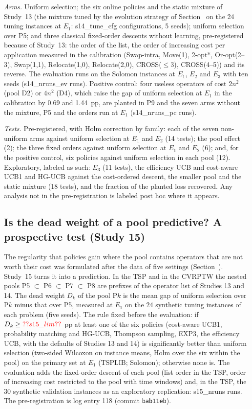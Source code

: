 \emph{Arms.} Uniform selection; the six online policies and the static mixture of Study~13 (the mixture tuned by the evolution strategy of Section~ on the 24 tuning instances at $E_1$: \num{s14_tune_cfg} configurations, 5 seeds); uniform selection over P5; and three classical fixed-order descents without learning, pre-registered because of Study~13: the order of the list, the order of increasing cost per application measured in the calibration (Swap-intra, Move(1), 2-opt*, Or-opt(2--3), Swap(1,1), Relocate(1,0), Relocate(2,0), CROSS($\le3$), CROSS(4--5)) and its reverse. The evaluation runs on the Solomon instances at $E_1$, $E_2$ and $E_3$ with ten seeds (\num{s14_nruns_ev} runs). Positive control: four useless operators of cost $2n^2$ (pool D2) or $4n^2$ (D4), which raise the gap of uniform selection at $E_1$ in the calibration by 0.69 and 1.44~pp, are planted in P9 and the seven arms without the mixture, P5 and the orders run at $E_1$ (\num{s14_nruns_pc} runs).

\emph{Tests.} Pre-registered, with Holm correction by family: each of the seven non-uniform arms against uniform selection at $E_1$ and $E_2$ (14 tests); the pool effect (2); the three fixed orders against uniform selection at $E_1$ and $E_2$ (6); and, for the positive control, six policies against uniform selection in each pool (12). Exploratory, labeled as such: $E_3$ (11 tests), the efficiency UCB and cost-aware UCB1 and HG-UCB against the cost-ordered descent, the smaller pool and the static mixture (18 tests), and the fraction of the planted loss recovered. Any analysis not in the pre-registration is labeled post hoc where it appears.


\subsection{Is the dead weight of a pool predictive? A prospective test (Study 15)}\label{sec:s15design}
The regularity that policies gain where the pool contains operators that are not worth their cost was formulated after the data of five settings (Section~). Study~15 turns it into a prediction. In the TSP and in the CVRPTW the nested pools P5 $\subset$ P6 $\subset$ P7 $\subset$ P8 are prefixes of the operator list of Studies 13 and 14. The dead weight $D_k$ of the pool P$k$ is the mean gap of uniform selection over P$k$ minus that over P5, measured at $E_1$ on the 24 synthetic tuning instances of each problem (five seeds). The rule fixed before the evaluation: if $D_k\ge\num{s15_lim}$~pp at least one of the six policies (cost-aware UCB1, probability matching and HG-UCB, Thompson sampling, EXP3, the efficiency UCB, with the defaults of Studies 13 and 14) is significantly better than uniform selection (two-sided Wilcoxon on instance means, Holm over the six within the pool) on the primary set at $E_1$ (TSPLIB; Solomon); otherwise none is. The evaluation adds the fixed-order descent of each pool (list order in the TSP, order of increasing cost restricted to the pool with time windows) and, in the TSP, the 30 synthetic validation instances as an exploratory replication: \num{s15_nruns} runs. The pre-registration is log entry 118 (commit \texttt{bab11eb}).

